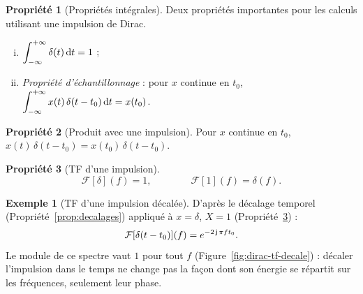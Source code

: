 \documentclass[a4paper,11pt]{article}
\theoremstyle{definition}
\newtheorem{proposition}{Propriété}[section]
\newtheorem{exemple}{Exemple}[section]
\newcommand{\highlight}[1]{{\color{niceblue}\emph{#1}}}
\begin{document}
\begin{proposition}[Propriétés intégrales]
    \label{prop:dirac-integrales}
    Deux propriétés importantes pour les calculs utilisant une impulsion de Dirac.
    \begin{enumerate}[(i)]
        \item $\displaystyle\int_{-\infty}^{+\infty}\delta(t)\,{\rm d} t = 1$ ;
        \item \highlight{Propriété d'échantillonnage} : pour $x$ continue en $t_0$, $\displaystyle\int_{-\infty}^{+\infty} x(t)\,\delta(t-t_0)\,{\rm d} t = x(t_0)$.
    \end{enumerate}
\end{proposition}

\begin{proposition}[Produit avec une impulsion]
    \label{prop:dirac-produit}
    Pour $x$ continue en $t_0$, $x(t)\,\delta(t-t_0) = x(t_0)\,\delta(t-t_0)$.
\end{proposition}


\begin{proposition}[TF d'une impulsion]
    \label{prop:dirac-tf}
    $$
        \mathcal F[\delta](f) = 1, \qquad\qquad \mathcal F[1](f) = \delta(f).
    $$
\end{proposition}

\begin{exemple}[TF d'une impulsion décalée]
    D'après le décalage temporel (Propriété~\ref{prop:decalages}) appliqué à $x=\delta$, $X=1$ (Propriété~\ref{prop:dirac-tf}) :
    $$
        \mathcal F[\delta(t-t_0)](f) = e^{-2\operatorname{\mathsf{j}}\pi ft_0}.
    $$
    Le module de ce spectre vaut $1$ pour tout $f$ (Figure~\ref{fig:dirac-tf-decale}) : décaler l'impulsion dans le temps ne change pas la façon dont son énergie se répartit sur les fréquences, seulement leur phase.
\end{exemple}
\end{document}

